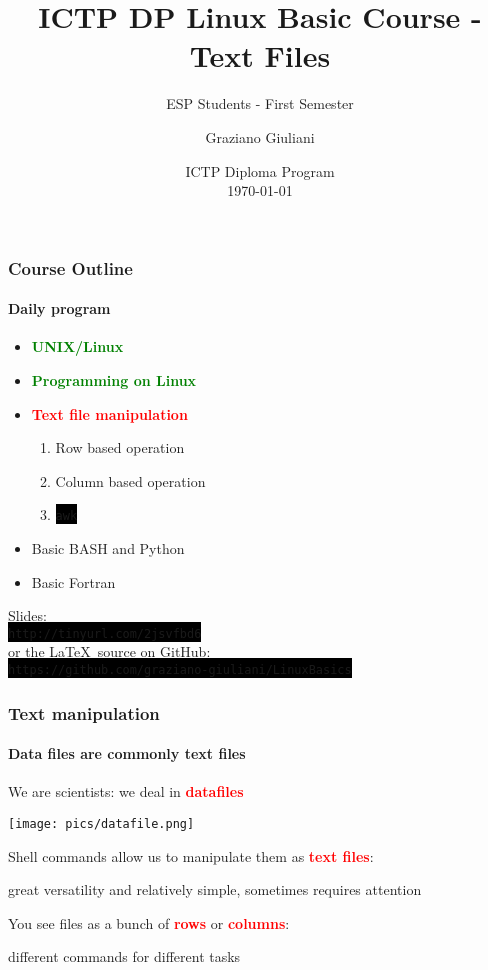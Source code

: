 \documentclass[unknownkeysallowed, 10pt, a4 paper, handout]{beamer}
\title[Linux Programming]{ICTP DP Linux Basic Course - Text Files}
\subtitle{ESP Students - First Semester}
\author[Graziano Giuliani]{Graziano Giuliani \\ \focus{ggiulian@ictp.it}}
\institute[ICTP]{The Abdus Salam International Centre for Theoretical Physics}
\date[\today]{ICTP Diploma Program \\ \today}
\newcommand{\focus}[1]{\textbf{\textcolor{red}{#1}}}
\newcommand{\expire}[1]{\textbf{\textcolor{green}{#1}}}
\newcommand{\code}[1]{\colorbox{black}{\color{green}\texttt{#1}}}
\begin{document}
\begin{frame}
  \titlepage
\end{frame}


\begin{frame}[label=outline]
  \frametitle{Course Outline \footnotemark}
  \framesubtitle{Daily program}
  \begin{itemize}
    \item \expire{UNIX/Linux}
    \item \expire{Programming on Linux}
    \item \focus{Text file manipulation}
      \begin{enumerate}
        \item Row based operation
        \item Column based operation
        \item \code{awk}
      \end{enumerate}
    \item Basic BASH and Python
    \item Basic Fortran
  \end{itemize}

  \vspace{6mm}

  Slides: \\ \code{http://tinyurl.com/2jsvfbd6}
  \vspace{4mm} \\
  or the \LaTeX \ source on GitHub: \\
  \code{https://github.com/graziano-giuliani/LinuxBasics}


\end{frame}


\begin{frame}
  \frametitle{Text manipulation}
  \framesubtitle{Data files are commonly text files}
  We are scientists: we deal in \focus{datafiles}

  \begin{center}
    \texttt{[image: pics/datafile.png]}
  \end{center}

  \begin{block}{}
    Shell commands allow us to manipulate them as \focus{text files}:\\
    \begin{center}
    great versatility and relatively simple, sometimes requires attention
    \end{center}
    You see files as a bunch of \focus{rows} or \focus{columns}:\\
    \begin{center}
    different commands for different tasks
    \end{center}
  \end{block}
\end{frame}
\end{document}
